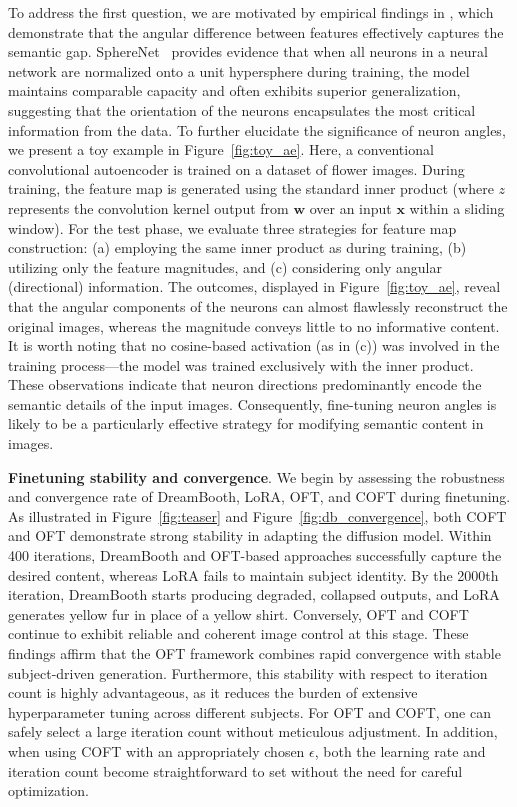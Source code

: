 \begin{itemize}[leftmargin=*,nosep]
To address the first question, we are motivated by empirical findings in \cite{liu2018decoupled,chen2020angular}, which demonstrate that the angular difference between features effectively captures the semantic gap. SphereNet~\cite{liu2017deep} provides evidence that when all neurons in a neural network are normalized onto a unit hypersphere during training, the model maintains comparable capacity and often exhibits superior generalization, suggesting that the orientation of the neurons encapsulates the most critical information from the data. To further elucidate the significance of neuron angles, we present a toy example in Figure~\ref{fig:toy_ae}. Here, a conventional convolutional autoencoder is trained on a dataset of flower images. During training, the feature map is generated using the standard inner product (where $z$ represents the convolution kernel output from $\bm{w}$ over an input $\bm{x}$ within a sliding window). For the test phase, we evaluate three strategies for feature map construction: (a) employing the same inner product as during training, (b) utilizing only the feature magnitudes, and (c) considering only angular (directional) information. The outcomes, displayed in Figure~\ref{fig:toy_ae}, reveal that the angular components of the neurons can almost flawlessly reconstruct the original images, whereas the magnitude conveys little to no informative content. It is worth noting that no cosine-based activation (as in (c)) was involved in the training process—the model was trained exclusively with the inner product. These observations indicate that neuron directions predominantly encode the semantic details of the input images. Consequently, fine-tuning neuron angles is likely to be a particularly effective strategy for modifying semantic content in images.

\textbf{Finetuning stability and convergence}. We begin by assessing the robustness and convergence rate of DreamBooth, LoRA, OFT, and COFT during finetuning. As illustrated in Figure~\ref{fig:teaser} and Figure~\ref{fig:db_convergence}, both COFT and OFT demonstrate strong stability in adapting the diffusion model. Within 400 iterations, DreamBooth and OFT-based approaches successfully capture the desired content, whereas LoRA fails to maintain subject identity. By the 2000th iteration, DreamBooth starts producing degraded, collapsed outputs, and LoRA generates yellow fur in place of a yellow shirt. Conversely, OFT and COFT continue to exhibit reliable and coherent image control at this stage. These findings affirm that the OFT framework combines rapid convergence with stable subject-driven generation. Furthermore, this stability with respect to iteration count is highly advantageous, as it reduces the burden of extensive hyperparameter tuning across different subjects. For OFT and COFT, one can safely select a large iteration count without meticulous adjustment. In addition, when using COFT with an appropriately chosen $\epsilon$, both the learning rate and iteration count become straightforward to set without the need for careful optimization.


\end{itemize}
